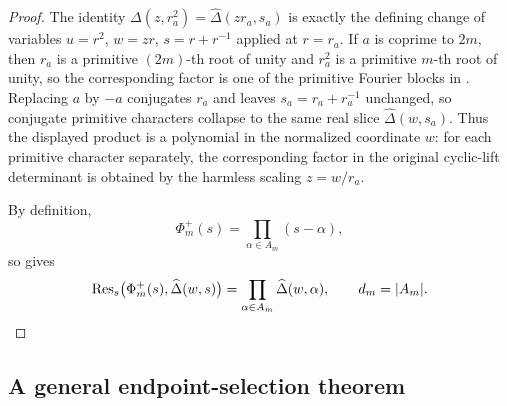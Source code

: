 \begin{proof}
The identity
\(\Delta(z,r_a^2)=\widehat\Delta(zr_a,s_a)\) is exactly the defining
change of variables \(u=r^2\), \(w=zr\), \(s=r+r^{-1}\) applied at
\(r=r_a\). If \(a\) is coprime to \(2m\), then \(r_a\) is a primitive
\((2m)\)-th root of unity and \(r_a^2\) is a primitive \(m\)-th root of
unity, so the corresponding factor is one of the primitive Fourier
blocks in . Replacing \(a\) by
\(-a\) conjugates \(r_a\) and leaves \(s_a=r_a+r_a^{-1}\) unchanged, so
conjugate primitive characters collapse to the same real slice
\(\widehat\Delta(w,s_a)\). Thus the displayed product is a polynomial in
the normalized coordinate \(w\): for each primitive character separately,
the corresponding factor in the original cyclic-lift determinant is
obtained by the harmless scaling \(z=w/r_a\).

By definition,
\[
  \Phi_m^+(s)=\prod_{\alpha\in A_m}(s-\alpha),
\]
so  gives
\[
  \operatorname{Res}_s\bigl(\Phi_m^+(s),\widehat\Delta(w,s)\bigr)
  =
    \prod_{\alpha\in A_m}\widehat\Delta(w,\alpha),
  \qquad d_m=|A_m|.
\]
\end{proof}

\subsection{A general endpoint-selection theorem}

